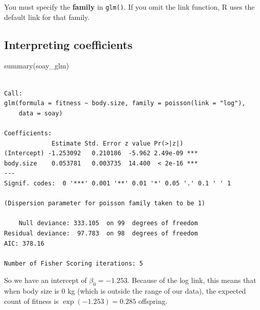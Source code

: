 \documentclass[
  letterpaper,
  8pt,
  a4paper]{book}
\newenvironment{Shaded}{\begin{snugshade}}{\end{snugshade}}
\newcommand{\FunctionTok}[1]{\textcolor[rgb]{0.28,0.35,0.67}{#1}}
\newcommand{\NormalTok}[1]{\textcolor[rgb]{0.00,0.23,0.31}{#1}}
\begin{document}
\begin{tcolorbox}[enhanced jigsaw, arc=.35mm, bottomrule=.15mm, bottomtitle=1mm, breakable, colback=white, colbacktitle=quarto-callout-important-color!10!white, colframe=quarto-callout-important-color-frame, coltitle=black, left=2mm, leftrule=.75mm, opacityback=0, opacitybacktitle=0.6, rightrule=.15mm, title=\textcolor{quarto-callout-important-color}{\faExclamation}\hspace{0.5em}{Important}, titlerule=0mm, toprule=.15mm, toptitle=1mm]

You must specify the \textbf{family} in \texttt{glm()}. If you omit the
link function, R uses the default link for that family.

\end{tcolorbox}

\subsection*{Interpreting coefficients}\label{interpreting-coefficients}

\begin{Shaded}
\begin{Highlighting}[]
\FunctionTok{summary}\NormalTok{(soay\_glm)}
\end{Highlighting}
\end{Shaded}

\begin{verbatim}

Call:
glm(formula = fitness ~ body.size, family = poisson(link = "log"), 
    data = soay)

Coefficients:
             Estimate Std. Error z value Pr(>|z|)    
(Intercept) -1.253092   0.210186  -5.962 2.49e-09 ***
body.size    0.053781   0.003735  14.400  < 2e-16 ***
---
Signif. codes:  0 '***' 0.001 '**' 0.01 '*' 0.05 '.' 0.1 ' ' 1

(Dispersion parameter for poisson family taken to be 1)

    Null deviance: 333.105  on 99  degrees of freedom
Residual deviance:  97.783  on 98  degrees of freedom
AIC: 378.16

Number of Fisher Scoring iterations: 5
\end{verbatim}

So we have an intercept of \(\beta_0 = -1.253\). Because of the log
link, this means that when body size is 0 kg (which is outside the range
of our data), the expected count of fitness is \(\exp(-1.253) = 0.285\)
offspring.
\end{document}
